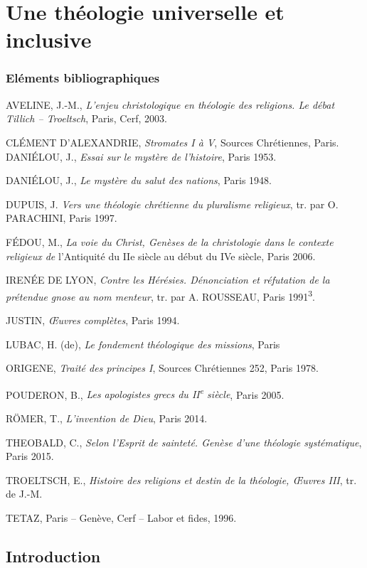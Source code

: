 \chapter{Une  théologie  universelle  et inclusive   }



\subsection{Eléments bibliographiques}

AVELINE, J.-M., \emph{L'enjeu christologique en théologie des religions.
Le débat Tillich -- Troeltsch}, Paris, Cerf, 2003.

CLÉMENT D'ALEXANDRIE, \emph{Stromates I à V}, Sources Chrétiennes,
Paris. DANIÉLOU, J., \emph{Essai sur le mystère de l'histoire}, Paris
1953.

DANIÉLOU, J., \emph{Le mystère du salut des nations}, Paris 1948.

DUPUIS, J. \emph{Vers une théologie chrétienne du pluralisme religieux},
tr. par O. PARACHINI, Paris 1997.

FÉDOU, M., \emph{La voie du Christ, Genèses de la christologie dans le
contexte religieux de} l'Antiquité du IIe siècle au début du IVe siècle,
Paris 2006.

IRENÉE DE LYON, \emph{Contre les Hérésies. Dénonciation et réfutation de
la prétendue gnose au nom menteur}, tr. par A. ROUSSEAU, Paris
1991\textsuperscript{3}.

JUSTIN, \emph{Œuvres complètes}, Paris 1994.

LUBAC, H. (de), \emph{Le fondement théologique des missions}, Paris

ORIGENE, \emph{Traité des principes I}, Sources Chrétiennes 252, Paris
1978. 

POUDERON, B., \emph{Les apologistes grecs du II\textsuperscript{e}
siècle}, Paris 2005.

RÖMER, T., \emph{L'invention de Dieu}, Paris 2014.

THEOBALD, C., \emph{Selon l'Esprit de sainteté. Genèse d'une théologie
systématique}, Paris 2015. 

TROELTSCH, E., \emph{Histoire des religions
et destin de la théologie, Œuvres III}, tr. de J.-M.

TETAZ, Paris -- Genève, Cerf -- Labor et fides, 1996.

 
\hypertarget{introduction}{%
\section{Introduction}\label{introduction}}

